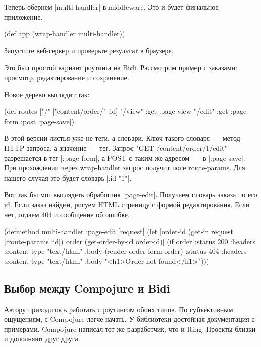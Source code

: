 Теперь обернем \spverb|multi-handler| в middleware. Это и будет финальное приложение.

\begin{code}
(def app
  (wrap-handler multi-handler))
\end{code}

Запустите веб-сервер и проверьте результат в браузере.

Это был простой вариант роутинга на Bidi. Рассмотрим пример с заказами:
просмотр, редактирование и сохранение.

Новое дерево выглядит так:

\begin{code}
(def routes
  ["/" {["content/order/" :id]
        {"/view" {:get  :page-view}
         "/edit" {:get  :page-form
                  :post :page-save}}}])
\end{code}

В этой версии листья уже не теги, а словари. Ключ такого словаря~--- метод
HTTP-запроса, а значение~--- тег. Запрос "GET /content/order/1/edit" разрешается в
тег \spverb|:page-form|, а POST с таким же адресом~--- в \spverb|:page-save|. При прохождении
через wrap-handler запрос получит поле route-params. Для нашего случая это будет
словарь \spverb|{:id "1"}|.

Вот так бы мог выглядеть обработчик \spverb|page-edit|. Получаем словарь заказа по его
id. Если заказ найден, рисуем HTML страницу с формой редактирования. Если нет,
отдаем 404 и сообщение об ошибке.

\begin{code}
(defmethod multi-handler :page-edit
  [request]
  (let [order-id (get-in request [:route-params :id])
        order (get-order-by-id order-id)]
    (if order
      {:status 200
       :headers {:content-type "text/html"}
       :body (render-order-form order)}
      {:status 404
       :headers {:content-type "text/html"}
       :body "<h1>Order not found</h1>"})))
\end{code}

\subsection{Выбор между Compojure и Bidi}

Автору приходилось работать с роутингом обоих типов. По субъективным ощущениям,
с Compojure легче начать. У библиотеки достойная документация с
примерами. Compojure написал тот же разработчик, что и Ring. Проекты близки и
дополняют друг друга.

